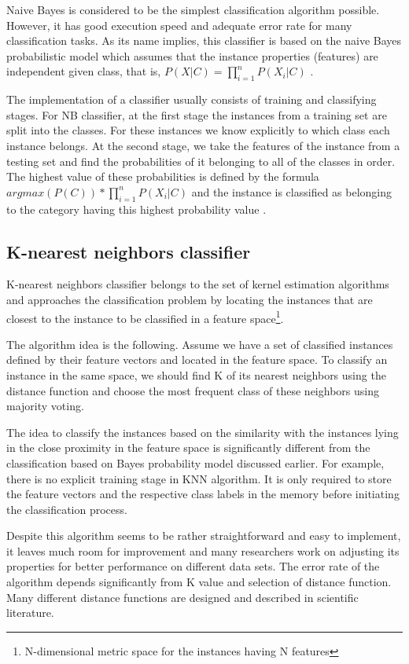 \documentclass{llncs}
\begin{document}
Naive Bayes is considered to be the simplest classification algorithm possible. However, it has good execution speed and adequate error rate for many classification tasks. As its name implies, this classifier is based on the naive Bayes probabilistic model which assumes that the instance properties (features) are independent given class, that is, \(P(X|C) = \prod_{i=1}^nP(X_i|C)\) \cite{Rish}.

The implementation of a classifier usually consists of training and classifying stages. For NB classifier, at the first stage the instances from a training set are split into the classes. For these instances we know explicitly to which class each instance belongs. At the second stage, we take the features of the instance from a testing set and find the probabilities of it belonging to all of the classes in order. The highest value of these probabilities is defined by the formula \(argmax(P(C)) * \prod_{i=1}^nP(X_i|C)\) and the instance is classified as belonging to the category having this highest probability value \cite{Manning}\cite{Rish}.

\subsection{K-nearest neighbors classifier}

K-nearest neighbors classifier belongs to the set of kernel estimation algorithms and approaches the classification problem by locating the instances that are closest to the instance to be classified in a feature space\footnote{N-dimensional metric space for the instances having N features}\cite{WikiKNN}.

The algorithm idea is the following. Assume we have a set of classified instances defined by their feature vectors and located in the feature space. To classify an instance in the same space, we should find K of its nearest neighbors using the distance function and choose the most frequent class of these neighbors using majority voting.

The idea to classify the instances based on the similarity with the instances lying in the close proximity in the feature space is significantly different from the classification based on Bayes probability model discussed earlier. For example, there is no explicit training stage in KNN algorithm. It is only required to store the feature vectors and the respective class labels in the memory before initiating the classification process.

Despite this algorithm seems to be rather straightforward and easy to implement, it leaves much room for improvement and many researchers work on adjusting its properties for better performance on different data sets. The error rate of the algorithm depends significantly from K value and selection of distance function. Many different distance functions are designed and described in scientific literature.
\end{document}
